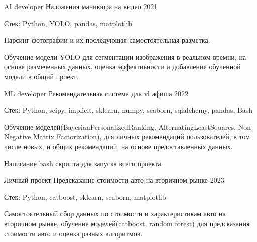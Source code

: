 

\begin{cventries}

  \cventry
    {AI developer} %
    {Наложения маникюра на видео} %
    {} %
    {2021} %
    {
      \begin{cvitems} %
        \item {Стек: Python, YOLO, pandas, matplotlib}
        \item {Парсинг фотографии и их последующая самостоятельная разметка.}
        \item {Обучение модели YOLO для сегментации изображения в реальном времни, на основе размеченных данных, оценка эффективности и добавление обученной модели в общий проект.}
      \end{cvitems}
    }

  \cventry
    {ML developer} %
    {Рекомендательная система для vl афиша} %
    {} %
    {2022} %
    {
      \begin{cvitems} %
        \item {Стек: Python, scipy, implicit, sklearn, numpy, seaborn, sqlalchemy, pandas, Bash}
        \item {Обучение моделей(BayesianPersonalizedRanking, AlternatingLeastSquares, Non-Negative Matrix Factorization), для личных рекомендаций пользователей, в том числе новых, и общих рекомендаций, на основе предоставленных данных.}
        \item {Написание bash скрипта для запуска всего проекта.}
      \end{cvitems}
    }
  \cventry
    {Личный проект} %
    {Предсказание стоимости авто на вторичном рынке} %
    {} %
    {2023} %
    {
      \begin{cvitems} %
        \item {Стек: Python, catboost, sklearn, seaborn, matplotlib}
        \item {Самостоятельный сбор данных по стоимости и характеристикам авто на вторичном рынке, обучение моделей(catboost, random forest) для предсказания стоимости авто и оценка разных алгоритмов.}
      \end{cvitems}
    }


\end{cventries}
